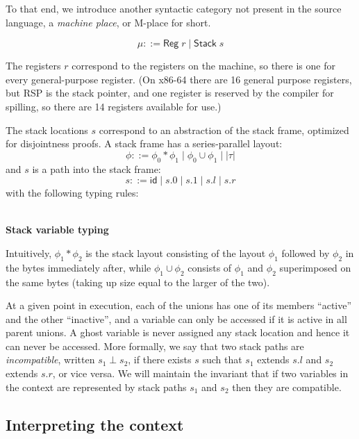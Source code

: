 \documentclass[acmsmall,nonacm]{acmart}
\newcommand{\proves}{\vdash}
\newcommand{\judgment}[2][]{\noindent\\\textbf{#1}\hspace{\stretch{1}}\fbox{$#2$}\nopagebreak}
\newcommand*{\axiom}[2][]{\infer[#1]{}{#2}}
\begin{document}
To that end, we introduce another syntactic category not present in the source language, a \emph{machine place}, or M-place for short.

$$\mu::=\mathsf{Reg}\;r\mid \mathsf{Stack}\;s$$

The registers $r$ correspond to the registers on the machine, so there is one for every general-purpose register. (On x86-64 there are 16 general purpose registers, but RSP is the stack pointer, and one register is reserved by the compiler for spilling, so there are 14 registers available for use.)

The stack locations $s$ correspond to an abstraction of the stack frame, optimized for disjointness proofs. A stack frame has a series-parallel layout:
$$\phi ::= \phi_0\ast\phi_1\mid \phi_0\cup \phi_1\mid |\tau|$$
and $s$ is a path into the stack frame:
$$s ::= \mathsf{id}\mid s.0\mid s.1 \mid s.l \mid s.r$$
with the following typing rules:

\judgment[Stack variable typing]{\phi\proves s:\phi'}

Intuitively, $\phi_1\ast\phi_2$ is the stack layout consisting of the layout $\phi_1$ followed by $\phi_2$ in the bytes immediately after, while $\phi_1\cup\phi_2$ consists of $\phi_1$ and $\phi_2$ superimposed on the same bytes (taking up size equal to the larger of the two).

At a given point in execution, each of the unions has one of its members ``active'' and the other ``inactive'', and a variable can only be accessed if it is active in all parent unions.
A ghost variable is never assigned any stack location and hence it can never be accessed. More formally, we say that two stack paths are \emph{incompatible}, written $s_1\perp s_2$, if there exists $s$ such that $s_1$ extends $s.l$ and $s_2$ extends $s.r$, or vice versa. We will maintain the invariant that if two variables in the context are represented by stack paths $s_1$ and $s_2$ then they are compatible.

\subsection{Interpreting the context}
\end{document}
